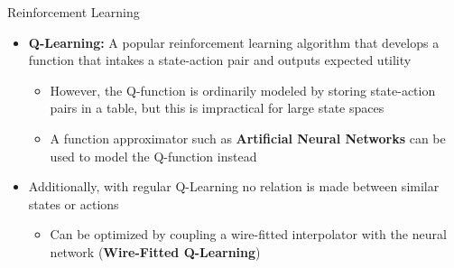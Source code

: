 \documentclass[final]{beamer}
\newlength{\onecolwid}
\newlength{\twocolwid}
\begin{document}
\begin{frame}[t]
\begin{columns}[t]
\begin{column}{\twocolwid}
\begin{columns}[t,totalwidth=\twocolwid]

	\begin{column}{\onecolwid}
		\begin{block}{Reinforcement Learning}
			\begin{itemize}
				\item \textbf{Q-Learning:} A popular reinforcement learning algorithm that develops a function that intakes a state-action pair and outputs expected utility
				\begin{itemize}
					\item However, the Q-function is ordinarily modeled by storing state-action pairs in a table, but this is impractical for large state spaces
					\item A function approximator such as \textbf{Artificial Neural Networks} can be used to model the Q-function instead
				\end{itemize}
				\item Additionally, with regular Q-Learning no relation is made between similar states or actions
				\begin{itemize}
					\item Can be optimized by coupling a wire-fitted interpolator with the neural network (\textbf{Wire-Fitted Q-Learning})
				\end{itemize}


\end{itemize}
\end{block}
\end{column}
\end{columns}
\end{column}
\end{columns}
\end{frame}
\end{document}

